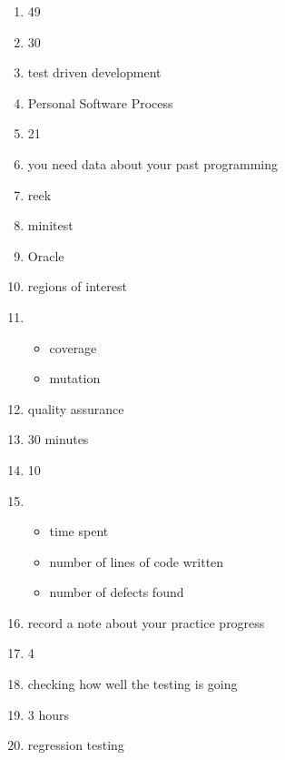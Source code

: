 \documentclass{exam}
\begin{document}
\begin{enumerate}
\item 49
\item 30
\item test driven development
\item Personal Software Process
\item 21
\item you need data about your past programming
\item reek
\item minitest
\item Oracle
\item regions of interest
\item \begin{itemize}
\item coverage
\item mutation
\end{itemize}
\item quality assurance
\item 30 minutes
\item 10
\item \begin{itemize}
\item time spent
\item number of lines of code written
\item number of defects found
\end{itemize}
\item record a note about your practice progress
\item 4
\item checking how well the testing is going
\item 3 hours
\item regression testing
\end{enumerate}
\end{document}
